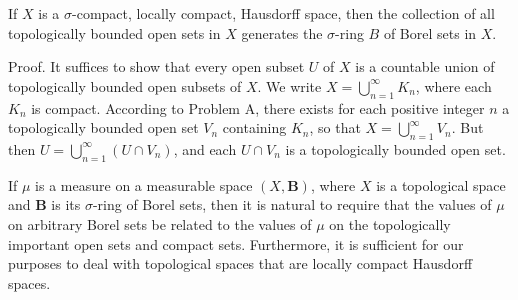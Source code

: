If $X$ is a $\sigma$-compact, locally compact, Hausdorff space, then the collection of all topologically bounded open sets in $X$ generates the $\sigma$-ring $B$ of Borel sets in $X$.

Proof. It suffices to show that every open subset $U$ of $X$ is a countable union of topologically bounded open subsets of $X$. We write $X = \bigcup_{n=1}^{\infty} K_n$, where each $K_n$ is compact. According to Problem A, there exists for each positive integer $n$ a topologically bounded open set $V_n$ containing $K_n$, so that $X = \bigcup_{n=1}^{\infty} V_n$. But then $U = \bigcup_{n=1}^{\infty} (U \cap V_n)$, and each $U \cap V_n$ is a topologically bounded open set.

If $\mu$ is a measure on a measurable space $(X, \mathbf{B})$, where $X$ is a topological space and $\mathbf{B}$ is its $\sigma$-ring of Borel sets, then it is natural to require that the values of $\mu$ on arbitrary Borel sets be related to the values of $\mu$ on the topologically important open sets and compact sets. Furthermore, it is sufficient for our purposes to deal with topological spaces that are locally compact Hausdorff spaces.
